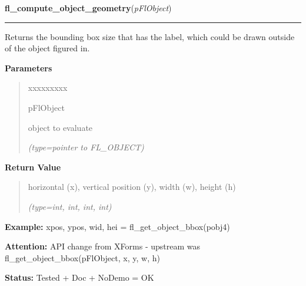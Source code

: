     \vspace{0.5ex}

\hspace{.8\funcindent}\begin{boxedminipage}{\funcwidth}

    \raggedright \textbf{fl\_compute\_object\_geometry}(\textit{pFlObject})

    \vspace{-1.5ex}

    \rule{\textwidth}{0.5\fboxrule}
\setlength{\parskip}{2ex}
    Returns the bounding box size that has the label, which could be drawn 
    outside of the object figured in.

\setlength{\parskip}{1ex}
      \textbf{Parameters}
      \vspace{-1ex}

      \begin{quote}
        \begin{Ventry}{xxxxxxxxx}

          \item[pFlObject]

          object to evaluate

            {\it (type=pointer to FL\_OBJECT)}

        \end{Ventry}

      \end{quote}

      \textbf{Return Value}
    \vspace{-1ex}

      \begin{quote}
      horizontal (x), vertical position (y), width (w), height (h)

      {\it (type=int, int, int, int)}

      \end{quote}

\textbf{Example:} xpos, ypos, wid, hei = fl\_get\_object\_bbox(pobj4)



\textbf{Attention:} API change from XForms - upstream was fl\_get\_object\_bbox(pFlObject, x, 
y, w, h)



\textbf{Status:} Tested + Doc + NoDemo = OK



    \end{boxedminipage}

    \label{xformslib:flbasic:fl_call_object_callback}

